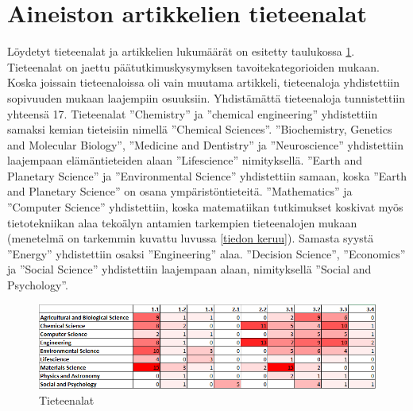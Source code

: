 \documentclass[utf8]{gradu3}
\begin{document}
\section{Aineiston artikkelien tieteenalat} \label{tieteenalat}
Löydetyt tieteenalat ja artikkelien lukumäärät on esitetty taulukossa 
\ref{fig:heatmap_v1}.
Tieteenalat on jaettu päätutkimuskysymyksen tavoitekategorioiden mukaan.
Koska joissain tieteenaloissa oli vain muutama artikkeli, 
tieteenaloja yhdistettiin sopivuuden mukaan laajempiin osuuksiin.
Yhdistämättä tieteenaloja tunnistettiin yhteensä 17.
Tieteenalat ''Chemistry'' ja ''chemical engineering'' yhdistettiin 
samaksi kemian tieteisiin nimellä ''Chemical Sciences''.
''Biochemistry, Genetics and Molecular Biology'', ''Medicine and Dentistry'' ja ''Neuroscience''
yhdistettiin laajempaan elämäntieteiden alaan ''Lifescience'' nimityksellä.
''Earth and Planetary Science'' ja ''Environmental Science'' yhdistettiin samaan, 
koska ''Earth and Planetary Science'' on osana ympäristöntieteitä.
''Mathematics'' ja ''Computer Science'' yhdistettiin, 
koska matematiikan tutkimukset koskivat myös tietotekniikan alaa tekoälyn 
antamien tarkempien tieteenalojen mukaan 
(menetelmä on tarkemmin kuvattu luvussa \ref{tiedon keruu}).
Samasta syystä ''Energy'' yhdistettiin osaksi ''Engineering'' alaa.
''Decision Science'', ''Economics'' ja ''Social Science'' yhdistettiin laajempaan alaan,
nimityksellä ''Social and Psychology''.

\begin{figure}[ht]
    \centering
    \includegraphics[width=1.0\linewidth]{Heatmap_v4.PNG}
    \caption{Tieteenalat}
    \label{fig:heatmap_v1}
\end{figure}
\end{document}
